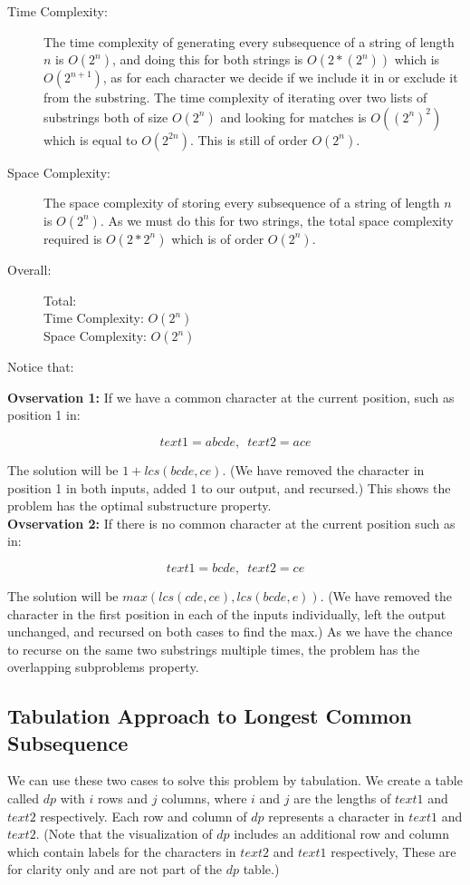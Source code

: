 \begin{description}
    \item[Time Complexity:]
        The time complexity of generating every subsequence of a string of length $n$ is $O(2^n)$,
        and doing this for both strings is $O(2 * (2^n))$ which is $O(2^{n+1})$,
        as for each character we decide if we include it in or exclude it from the substring.
        The time complexity of iterating over two lists of substrings both of size $O(2^n)$ and looking for matches is $O((2^n)^2)$ which is equal to $O(2^{2n})$.
        This is still of order $O(2^n)$.

        
    \item[Space Complexity:]
        The space complexity of storing every subsequence of a string of length $n$ is $O(2^n)$.
        As we must do this for two strings, the total space complexity required is $O(2 * 2^n)$ which is of order $O(2^n)$.

    \item[Overall:] Total:\\
        Time Complexity: $O(2^n)$\\
        Space Complexity: $O(2^n)$
    
\end{description}

Notice that:

\textbf{Ovservation 1:} If we have a common character at the current position, such as position 1 in:

$$text1=abcde,\phantom{0} text2=ace$$

The solution will be $1 + lcs(bcde,ce)$. (We have removed the character in position 1 in both inputs, added 1 to our output, and recursed.)
This shows the problem has the optimal substructure property.\\

\textbf{Ovservation 2:} If there is no common character at the current position such as in:

$$text1=bcde,\phantom{0} text2=ce$$

The solution will be $max(lcs(cde,ce), lcs(bcde,e))$. (We have removed the character in the first position in each of the inputs individually, left the output unchanged, and recursed on both cases to find the max.)
As we have the chance to recurse on the same two substrings multiple times, the problem has the overlapping subproblems property.
\subsection{Tabulation Approach to Longest Common Subsequence}
We can use these two cases to solve this problem by tabulation.
We create a table called $dp$ with $i$ rows and $j$ columns, where $i$ and $j$ are the lengths of $text1$ and $text2$ respectively.
Each row and column of $dp$ represents a character in $text1$ and $text2$. (Note that the visualization of $dp$ includes an additional row and column which contain labels for the characters in $text2$ and $text1$ respectively, These are for clarity only and are not part of the $dp$ table.)

